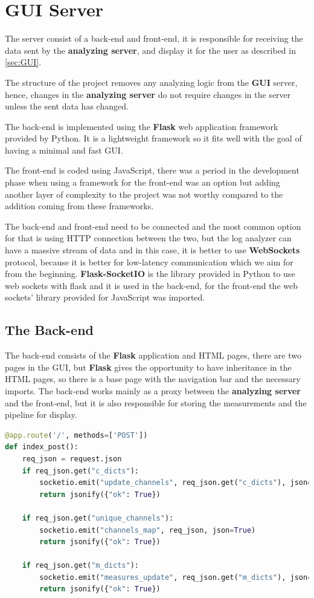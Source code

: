 \section{GUI Server}
The server consist of a back-end and front-end, it is responsible for receiving the data sent by the 
\textbf{analyzing server}, and display it for the user as described in \ref{sec:GUI}.

The structure of the project removes any analyzing logic from the \textbf{GUI} server, hence,
changes in the \textbf{analyzing server} do not require changes in the server unless the sent 
data has changed.

The back-end is implemented using the \textbf{Flask}\cite{flask} web application framework provided 
by Python. It is a lightweight framework so it fits well with the goal of having a minimal and fast
GUI.

The front-end is coded using JavaScript, there was a period in the development phase when using a framework
for the front-end was an option but adding another layer of complexity to the project was not worthy compared
to the addition coming from these frameworks.

The back-end and front-end need to be connected and the most common option for that is using HTTP connection
between the two, but the log analyzer can have a massive stream of data and in this case, it is better to use
\textbf{WebSockets} protocol, because it is better for low-latency communication which we aim for from the
beginning. \textbf{Flask-SocketIO}\cite{flask-socketio} is the library provided in Python to use web sockets with flask and it is
used in the back-end, for the front-end the web sockets' library provided for JavaScript was imported.

\subsection{The Back-end}
The back-end consists of the \textbf{Flask} application and HTML pages, there are two pages in the
GUI, but \textbf{Flask} gives the opportunity to have inheritance in the HTML pages, so there is
a base page with the navigation bar and the necessary imports. The back-end works mainly as a proxy
between the \textbf{analyzing server} and the front-end, but it is also responsible for storing 
the measurements and the pipeline for display.
\newline
\begin{lstlisting}[language=Python, caption={Post requests handling for the home page},captionpos=b]
@app.route('/', methods=['POST'])
def index_post():
	req_json = request.json
	if req_json.get("c_dicts"):
		socketio.emit("update_channels", req_json.get("c_dicts"), json=True)
		return jsonify({"ok": True})

	if req_json.get("unique_channels"):
		socketio.emit("channels_map", req_json, json=True)
		return jsonify({"ok": True})

	if req_json.get("m_dicts"):
		socketio.emit("measures_update", req_json.get("m_dicts"), json=True)
		return jsonify({"ok": True})
\end{lstlisting}

